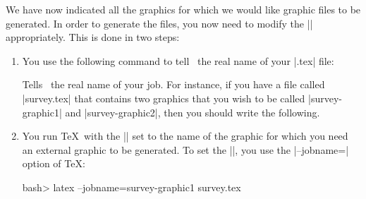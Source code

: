 We have now indicated all the graphics for which we would like graphic files to
be generated. In order to generate the files, you now need to modify the
|\jobname| appropriately. This is done in two steps:
%
\begin{enumerate}
    \item You use the following command to tell \pgfname\ the real name of your
        |.tex| file:
        \begin{command}{\pgfrealjobname{}}
            Tells \pgfname\ the real name of your job. For instance, if you
            have a file called |survey.tex| that contains two graphics that you
            wish to be called |survey-graphic1| and |survey-graphic2|, then you
            should write the following.
        \end{command}
    \item You run \TeX\ with the |\jobname| set to the name of the graphic for
        which you need an external graphic to be generated. To set the
        |\jobname|, you use the |--jobname=| option of \TeX:
\begin{codeexample}[code only, tikz syntax=false]
bash> latex --jobname=survey-graphic1 survey.tex
\end{codeexample}
\end{enumerate}

